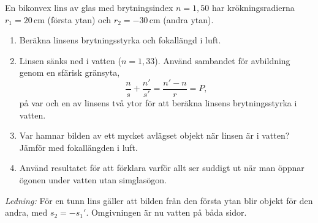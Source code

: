 En bikonvex lins av glas med brytningsindex $n = 1{,}50$ har krökningsradierna $r_1 = 20\,\mathrm{cm}$ (första ytan) och $r_2 = -30\,\mathrm{cm}$ (andra ytan).
\begin{enumerate}
  \item Beräkna linsens brytningsstyrka och fokallängd i luft.
  \item Linsen sänks ned i vatten ($n = 1{,}33$). Använd sambandet för avbildning genom en sfärisk gränsyta,
  \[
    \frac{n}{s} + \frac{n'}{s'} = \frac{n' - n}{r} = P,
  \]
  på var och en av linsens två ytor för att beräkna linsens brytningsstyrka i vatten.
  \item Var hamnar bilden av ett mycket avlägset objekt när linsen är i vatten? Jämför med fokallängden i luft.
  \item Använd resultatet för att förklara varför allt ser suddigt ut när man öppnar ögonen under vatten utan simglasögon.
\end{enumerate}

\emph{Ledning:} För en tunn lins gäller att bilden från den första ytan blir objekt för den andra, med $s_2 = -s_1'$. Omgivningen är nu vatten på båda sidor.
